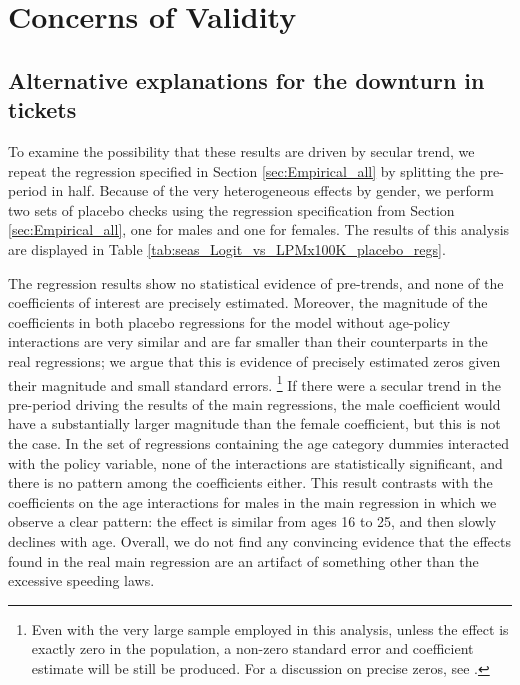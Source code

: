 \section{Concerns of Validity}
\label{sec:Validity}


\subsection{Alternative explanations for the downturn in tickets}

To examine the possibility that these results are driven by secular trend, 
we repeat the regression specified in 
Section \ref{sec:Empirical_all} 
by splitting the pre-period in half. 
Because of the very heterogeneous effects by gender, 
we perform two sets of placebo checks using the regression specification from 
Section \ref{sec:Empirical_all}, 
one for males and one for females. 
The results of this analysis are displayed in 
Table \ref{tab:seas_Logit_vs_LPMx100K_placebo_regs}. %




The regression results show no statistical evidence of pre-trends, 
and none of the coefficients of interest are precisely estimated. 
Moreover, the magnitude of the coefficients in both placebo regressions 
for the model without age-policy interactions are very similar 
and are far smaller than their counterparts in the real regressions; 
we argue that this is evidence of precisely estimated zeros 
given their magnitude and small standard errors.%
\footnote{%
Even with the very large sample employed in this analysis, 
unless the effect is exactly zero in the population, 
a non-zero standard error and coefficient estimate will be still be produced. 
For a discussion on precise zeros, see 
\citet{penney2013}. 
}
%
If there were a secular trend in the pre-period driving the results of the main regressions, 
the male coefficient would have a substantially larger magnitude than the female coefficient, 
but this is not the case. 
In the set of regressions containing the age category dummies interacted with the policy variable, 
none of the interactions are statistically significant, and there is no pattern among the coefficients either.
This result contrasts with the coefficients on the age interactions for males 
in the main regression in which we observe a clear pattern: 
the effect is similar from ages 16 to 25, and then slowly declines with age. 
Overall, we do not find any convincing evidence that the effects found in the 
real main regression are an artifact of something other than the excessive speeding laws.


